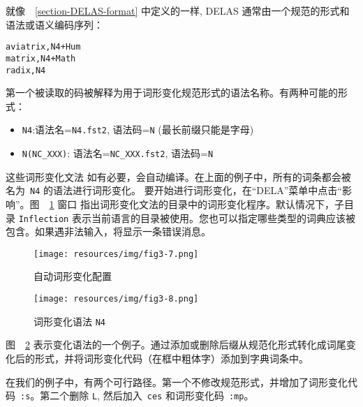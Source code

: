 就像\ ~\ref{section-DELAS-format} 中定义的一样, DELAS 通常由一个规范的形式和语法或语义编码序列：


\begin{verbatim}
aviatrix,N4+Hum
matrix,N4+Math
radix,N4
\end{verbatim}

\bigskip
\noindent 第一个被读取的码被解释为用于词形变化规范形式的语法名称。有两种可能的形式：

\begin{itemize}
\item \verb+N4+:语法名=\verb+N4.fst2+, 语法码=\verb+N+
	(最长前缀只能是字母)
  \item \verb+N(NC_XXX)+: 语法名=\verb+NC_XXX.fst2+, 语法码=\verb+N+
\end{itemize}

\bigskip
\noindent 这些词形变化文法 如有必要，会自动编译。在上面的例子中，所有的词条都会被名为\ \verb+N4+ 的语法进行词形变化。
\bigskip
\noindent 要开始进行词形变化，在“DELA”菜单中点击“影响”。图\ ~\ref{fig-inflection-configuration} 窗口 指出词形变化文法的目录中的词形变化程序。默认情况下，子目录
\verb+Inflection+ 表示当前语言的目录被使用。您也可以指定哪些类型的词典应该被包含。如果遇非法输入，将显示一条错误消息。

\bigskip
\begin{figure}[h]
\begin{center}
\texttt{[image: resources/img/fig3-7.png]}
\caption{自动词形变化配置\label{fig-inflection-configuration}}
\end{center}
\end{figure}

\bigskip
\begin{figure}[h]
\begin{center}
\texttt{[image: resources/img/fig3-8.png]}
\caption{词形变化语法
\texttt{N4}\label{fig-example-inflectional-grammar}}
\end{center}
\end{figure}

\bigskip
\noindent 图\ ~\ref{fig-example-inflectional-grammar} 表示变化语法的一个例子。通过添加或删除后缀从规范化形式转化成词尾变化后的形式，并将词形变化代码（在框中粗体字）添加到字典词条中。

\bigskip
\noindent 在我们的例子中，有两个可行路径。第一个不修改规范形式，并增加了词形变化代码\ \verb+:s+。第二个删除
\verb+L+, 然后加入\ \verb+ces+ 和词形变化码\ \verb+:mp+。

